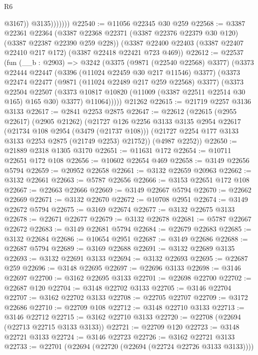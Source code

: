 \begin{lexlean}{R6}
\begin{coremodule}
                      @3167))
                  @3135)))))))
@22540 := @11056 @22345 @30 @259
@22568 := @3387
    @22361
    @22364
    (@3387 @22368 @22371 (@3387 @22376 @22379 @30 @120) (@3387 @22387 @22390 @259 @228))
    (@3387 @22400 @22403 (@3387 @22407 @22410 @217 @172) (@3387 @22418 @22421 @723 @469))
@22612 := @22537
    (fun (__b : @2903) =>
    @3242
      (@3375
        (@9871 (@22540 @22568) @3377)
        (@3373
          @22444
          @22447
          (@3396 (@11024 @22459 @30 @217 @11546) @3377)
          (@3373
            @22474
            @22477
            (@9871 (@11024 @22489 @217 @259 @22568) @3377)
            (@3373
              @22504
              @22507
              (@3373 @10817 @10820 (@11009 (@3387 @22511 @22514 @30 @165) @165 @30) @3377)
              @11064)))))
    @21262
@22615 := @21719 @2257 @3136 @3133
@22617 := @2841 @2253 @2875
@22647 := @22612
    (@22615
      (@2955 @22617)
      (@2905 @21262)
      (@21727
        @126
        @2256
        @3133
        @3135
        @2954
        @22617
        (@21734 @108 @2954 (@3479 (@21737 @108)))
        (@21727 @2254 @177 @3133 @3133 @2253 @2875 (@21749 @2253) @21752))
      (@4987 @2252))
@22650 := @21889 @2318 @1305 @3170
@22651 := @11631 @172
@22654 := @10711 @22651 @172 @108
@22656 := @10602 @22654 @469
@22658 := @3149 @22656 @5794
@22659 := @20952 @22658
@22661 := @3132 @22659 @20963
@22662 := @3132 @22661
@22663 := @5787 @22656
@22666 := @3153 @22651 @172 @108
@22667 := @22663 @22666
@22669 := @3149 @22667 @5794
@22670 := @22662 @22669
@22671 := @3132 @22670
@22672 := @10708 @2951
@22674 := @3149 @22672 @5794
@22675 := @3169 @22674
@22677 := @3132 @22675 @3133
@22678 := @22671 @22677
@22679 := @3132 @22678
@22681 := @5787 @22667 @22672
@22683 := @3149 @22681 @5794
@22684 := @22679 @22683
@22685 := @3132 @22684
@22686 := @10654 @2951
@22687 := @3149 @22686
@22688 := @22687 @5794
@22689 := @3169 @22688
@22691 := @3132 @22689 @3135
@22693 := @3132 @22691 @3133
@22694 := @3132 @22693
@22695 := @22687 @259
@22696 := @3148 @22695
@22697 := @22696 @3133
@22698 := @3146 @22697
@22700 := @3162 @22695 @3133
@22701 := @22698 @22700
@22702 := @22687 @120
@22704 := @3148 @22702 @3133
@22705 := @3146 @22704
@22707 := @3162 @22702 @3133
@22708 := @22705 @22707
@22709 := @3172 @22686
@22710 := @22709 @108
@22712 := @3148 @22710 @3133
@22713 := @3146 @22712
@22715 := @3162 @22710 @3133
@22720 := @22708 (@22694 (@22713 @22715 @3133 @3133))
@22721 := @22709 @120
@22723 := @3148 @22721 @3133
@22724 := @3146 @22723
@22726 := @3162 @22721 @3133
@22733 := @22701 (@22694 (@22720 (@22694 (@22724 @22726 @3133 @3133))))

\end{coremodule}
\end{lexlean}
